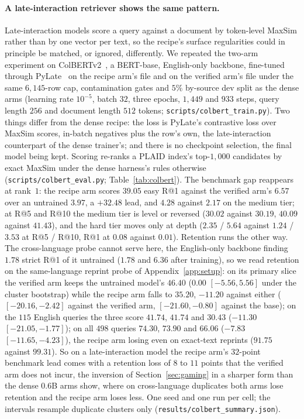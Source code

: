 \paragraph{A late-interaction retriever shows the same pattern.}
Late-interaction models score a query against a document by token-level MaxSim rather than by one vector per text, so the recipe's surface regularities could in principle be matched, or ignored, differently. We repeated the two-arm experiment on ColBERTv2~\citep{santhanam2022colbertv2}, a BERT-base, English-only backbone, fine-tuned through PyLate~\citep{chaffin2025pylate} on the recipe arm's file and on the verified arm's file under the same $6{,}145$-row cap, contamination gates and $5\%$ by-source dev split as the dense arms (learning rate $10^{-5}$, batch $32$, three epochs, $1{,}449$ and $933$ steps, query length $256$ and document length $512$ tokens; \texttt{scripts/colbert\_train.py}). Two things differ from the dense recipe: the loss is PyLate's contrastive loss over MaxSim scores, in-batch negatives plus the row's own, the late-interaction counterpart of the dense trainer's; and there is no checkpoint selection, the final model being kept. Scoring re-ranks a PLAID index's top-$1{,}000$ candidates by exact MaxSim under the dense harness's rules otherwise (\texttt{scripts/colbert\_eval.py}; Table~\ref{tab:colbert}). The benchmark gap reappears at rank~$1$: the recipe arm scores $39.05$ easy R@1 against the verified arm's $6.57$ over an untrained $3.97$, a $+32.48$ lead, and $4.28$ against $2.17$ on the medium tier; at R@5 and R@10 the medium tier is level or reversed ($30.02$ against $30.19$, $40.09$ against $41.43$), and the hard tier moves only at depth ($2.35$ / $5.64$ against $1.24$ / $3.53$ at R@5 / R@10, R@1 at $0.08$ against $0.01$). Retention runs the other way. The cross-language probe cannot serve here, the English-only backbone finding $1.78$ strict R@1 of it untrained ($1.78$ and $6.36$ after training), so we read retention on the same-language reprint probe of Appendix~\ref{app:setup}: on its primary slice the verified arm keeps the untrained model's $46.40$ ($0.00$ $[-5.56, 5.56]$ under the cluster bootstrap) while the recipe arm falls to $35.20$, $-11.20$ against either ($[-20.16, -2.42]$ against the verified arm, $[-21.60, -0.80]$ against the base); on the $115$ English queries the three score $41.74$, $41.74$ and $30.43$ ($-11.30$ $[-21.05, -1.77]$); on all $498$ queries $74.30$, $73.90$ and $66.06$ ($-7.83$ $[-11.65, -4.23]$), the recipe arm losing even on exact-text reprints ($91.75$ against $99.31$). So on a late-interaction model the recipe arm's $32$-point benchmark lead comes with a retention loss of $8$ to $11$ points that the verified arm does not incur, the inversion of Section~\ref{sec:gaming} in a sharper form than the dense $0.6$B arms show, where on cross-language duplicates both arms lose retention and the recipe arm loses less. One seed and one run per cell; the intervals resample duplicate clusters only (\texttt{results/colbert\_summary.json}).

